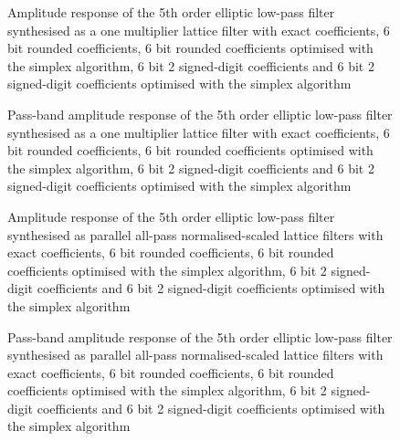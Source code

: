 \documentclass[a4paper,twoside,10pt,english]{report}
\begin{document}
\begin{figure}[!htbp]
\begin{center}
\scalebox{0.7}{}
\caption{Amplitude response of the 5th order elliptic low-pass
filter synthesised as a one multiplier lattice filter with exact 
coefficients, 6 bit rounded coefficients, 6 bit rounded coefficients
optimised with the simplex algorithm, 6 bit 2 signed-digit coefficients and
6 bit 2 signed-digit coefficients optimised with the simplex algorithm}
\label{fig:simplex_OneM_lattice_response}
\end{center}
\end{figure}
\begin{figure}[!htbp]
\begin{center}
\scalebox{0.7}{}
\caption{Pass-band amplitude response of the 5th order elliptic low-pass
filter synthesised as a one multiplier lattice filter with exact 
coefficients, 6 bit rounded coefficients, 6 bit rounded coefficients
optimised with the simplex algorithm, 6 bit 2 signed-digit coefficients and
6 bit 2 signed-digit coefficients optimised with the simplex algorithm}
\label{fig:simplex_OneM_lattice_passband_response}
\end{center}
\end{figure}
\begin{figure}[!htbp]
\begin{center}
\scalebox{0.7}{}
\caption{Amplitude response of the 5th order elliptic low-pass filter 
synthesised as parallel all-pass normalised-scaled lattice filters with exact
coefficients, 6 bit rounded coefficients, 6 bit rounded coefficients
optimised with the simplex algorithm, 6 bit 2 signed-digit coefficients and
6 bit 2 signed-digit coefficients optimised with the simplex algorithm}
\label{fig:simplex_NSPA_lattice_response}
\end{center}
\end{figure}
\begin{figure}[!htbp]
\begin{center}
\scalebox{0.7}{}
\caption{Pass-band amplitude response of the 5th order elliptic low-pass filter
synthesised as parallel all-pass normalised-scaled lattice filters with exact
coefficients, 6 bit rounded coefficients, 6 bit rounded coefficients
optimised with the simplex algorithm, 6 bit 2 signed-digit coefficients and
6 bit 2 signed-digit coefficients optimised with the simplex algorithm}
\label{fig:simplex_NSPA_lattice_passband_response}
\end{center}
\end{figure}
\end{document}
